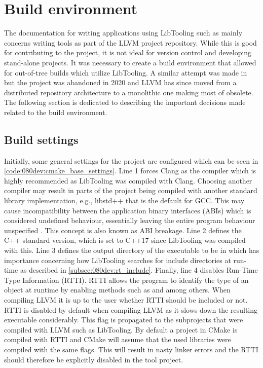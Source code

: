 \section{Build environment} \label{sec:080dev:build_env}

The documentation for writing applications using LibTooling such as \cite{clangMatchingClangAST, clangClangTransformerTutorial} mainly concerns writing tools as part of the LLVM project repository. While this is good for contributing to the project, it is not ideal for version control and developing stand-alone projects.
It was necessary to create a build environment that allowed for out-of-tree builds which utilize LibTooling. A similar attempt was made in \cite{kasmisClangOutoftreeBuild2023} but the project was abandoned in 2020 and LLVM has since moved from a distributed repository architecture to a monolithic one making most of \cite{kasmisClangOutoftreeBuild2023} obsolete.
The following section is dedicated to describing the important decisions made related to the build environment.

\subsection{Build settings}

Initially, some general settings for the project are configured which can be seen in \cref{code:080dev:cmake_base_settings}.
Line 1 forces Clang as the compiler which is highly recommended as LibTooling was compiled with Clang. Choosing another compiler may result in parts of the project being compiled with another standard library implementation, e.g., libstd++ that is the default for GCC. This may cause incompatibility between the application binary interfaces (ABIs) which is considered undefined behaviour, essentially leaving the entire program behaviour unspecified \cite{cppreferenceUndefinedBehaviorCppreference}. This concept is also known as ABI breakage.
Line 2 defines the C++ standard version, which is set to C++17 since LibTooling was compiled with this.
Line 3 defines the output directory of the executable to be in  which has importance concerning how LibTooling searches for include directories at run-time as described in \cref{subsec:080dev:rt_include}.
Finally, line 4 disables Run-Time Type Information (RTTI). RTTI allows the program to identify the type of an object at runtime by enabling methods such as  and  among others. When compiling LLVM it is up to the user whether RTTI should be included or not. RTTI is disabled by default when compiling LLVM as it slows down the resulting executable considerably. This flag is propagated to the subprojects that were compiled with LLVM such as LibTooling. By default a project in CMake is compiled with RTTI and CMake will assume that the used libraries were compiled with the same flags. This will result in nasty linker errors and the RTTI should therefore be explicitly disabled in the tool project.

